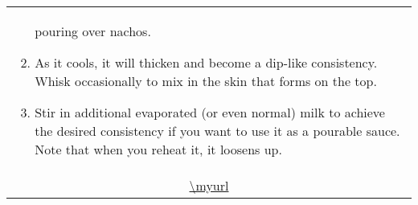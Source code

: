 \documentclass[web-recipes.tex]{subfiles}
\begin{document}
\begin{tabular}{l}
\begin{minipage}[t]{0.55\textwidth}
\begin{enumerate}
          pouring over nachos.
        \item As it cools, it will thicken and become a dip-like consistency.
          Whisk occasionally to mix in the skin that forms on the top.
        \item Stir in additional evaporated (or even normal) milk to achieve
          the desired consistency if you want to use it as a pourable sauce.
          Note that when you reheat it, it loosens up.
      \end{enumerate}
    \end{minipage} \vspace{3ex}\\
    \multicolumn{1}{c}{\small\ttfamily \url{\myurl}} \\
  \end{tabular}
\end{document}
